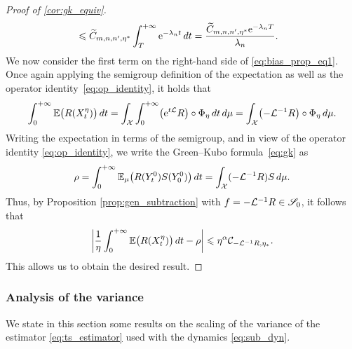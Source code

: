 \begin{proof}[Proof of \cref{cor:gk_equiv}]
\begin{align}
		&\leq \widetilde{C}_{m,n,n',\eta^*}\int_T^{+\infty} \e^{-\lambda_n t} \, dt %
		= \frac{\widetilde{C}_{m,n,n',\eta^*}\e^{-\lambda_n T}}{\lambda_n}. %
	\end{align}
	We now consider the first term on the right-hand side of \eqref{eq:bias_prop_eq1}. 
	Once again applying the semigroup definition of the expectation as well as the operator identity~\eqref{eq:op_identity}, it holds that
	\begin{align}
		\int_0^{+\infty} \E\bigl(R(X^\eta_t)\bigr) \, dt %
		= \int_\mathcal{X}\int_0^{+\infty} \bigl(\e^{t\L}R\bigr)\circ \Phi_\eta \, dt \, d\mu
		= \int_\mathcal{X} \bigl(-\L^{-1}R\bigr)\circ \Phi_\eta \, d\mu.
		\label{eq:cor_Tint_to_LinvR}
	\end{align}
	Writing the expectation in terms of the semigroup, and in view of the operator identity \eqref{eq:op_identity}, we write the Green--Kubo formula~\eqref{eq:gk} as
	\begin{align}
		\rho = \int_0^{+\infty} \mathbb{E}_\mu\bigl(R(Y_t^0)S(Y_0^0)\bigr) \, dt = \int_\mathcal{X} (-\mathcal{L}^{-1}R)S \, d\mu.
	\end{align}
	Thus, by Proposition \ref{prop:gen_subtraction} with $f = -\mathcal{L}^{-1}R \in \mathscr{S}_0$, it follows that
	\begin{equation}
		\abs*{\frac{1}{\eta}\int_0^{+\infty} \E\bigl(R(X^\eta_t)\bigr) \, dt - \rho} \leq \eta^{\alpha} \mathcal{C}_{-\L^{-1}R,\eta_*}.
		\label{eq:cor_eta_bias}
	\end{equation}
	This allows us to obtain the desired result.
\end{proof}

\subsubsection{Analysis of the variance}
\label{subsubsec:variance_analysis}
We state in this section some results on the scaling of the variance of the estimator \eqref{eq:ts_estimator} used with the dynamics \eqref{eq:sub_dyn}.

